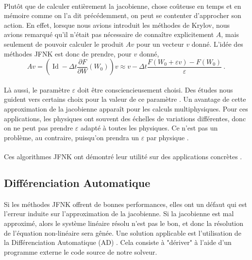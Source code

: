       \paragraph{}
      Plutôt que de calculer entièrement la jacobienne, chose coûteuse en temps et en mémoire comme on l'a dit précédemment, on peut se contenter d'approcher son action.
      En effet, lorsque nous avions introduit les méthodes de Krylov, nous avions remarqué qu'il n'était pas nécessaire de connaître explicitement $A$, mais seulement de pouvoir calculer le produit $Av$ pour un vecteur $v$ donné.
      L'idée des méthodes JFNK est donc de prendre, pour $v$ donné,
      \[Av = \left(\operatorname{Id} - \Delta t\frac{\partial F}{\partial W}\left(W_0\right)\right)v \approx v - \Delta t\frac{F\left(W_0 + \varepsilon v\right) - F\left(W_0\right)}{\varepsilon}\ .\]

      \paragraph{}
      Là aussi, le paramètre $\varepsilon$ doit être consciencieusement choisi.
      Des études nous guident vers certains choix pour la valeur de ce paramètre \cite{KnollKeyes2004}.
      Un avantage de cette approximation de la jacobienne apparaît pour les calculs multiphysiques.
      Pour ces applications, les physiques ont souvent des échelles de variations différentes, donc on ne peut pas prendre $\varepsilon$ adapté à toutes les physiques.
      Ce n'est pas un problème, au contraire, puisqu'on prendra un $\varepsilon$ par physique \cite{Turpault2003}.

      \paragraph{}
      Ces algorithmes JFNK ont démontré leur utilité sur des applications concrètes \cite{LiuZhangZhongEtAl2015, FrancoCamierAndrejEtAl2020}.


  \subsection{Différenciation Automatique}

    \paragraph{}
    Si les méthodes JFNK offrent de bonnes performances, elles ont un défaut qui est l'erreur induite sur l'approximation de la jacobienne.
    Si la jacobienne est mal approximé, alors le système linéaire résolu n'est pas le bon, et donc la résolution de l'équation non-linéaire sera gênée.
    Une solution applicable est l'utilisation de la Différenciation Automatique (AD) \cite{Griewank2000}.
    Cela consiste à "dériver" à l'aide d'un programme externe \cite{HascoeetPascual2012} le code source de notre solveur.

